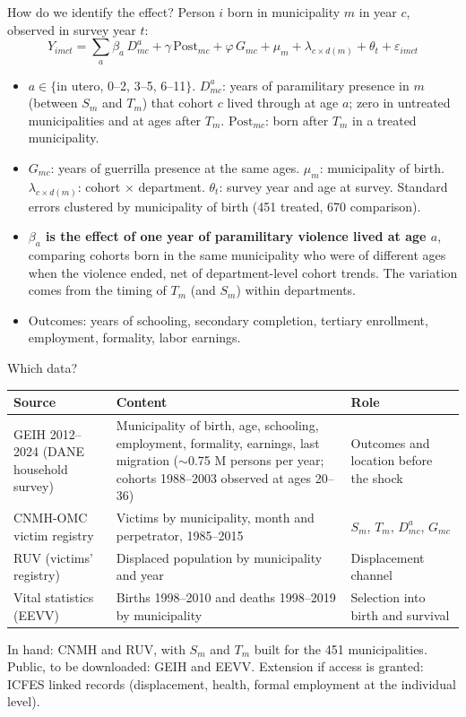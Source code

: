 \documentclass[aspectratio=169,10pt]{beamer}
\begin{document}
\begin{frame}{How do we identify the effect?}
Person $i$ born in municipality $m$ in year $c$, observed in survey year $t$:
\begin{equation*}
Y_{imct} = \sum_{a} \beta_a\, D^{a}_{mc} + \gamma\, \text{Post}_{mc} + \varphi\, G_{mc} + \mu_m + \lambda_{c \times d(m)} + \theta_{t} + \varepsilon_{imct}
\end{equation*}
\small
\begin{itemize}
\item $a \in \{$in utero, 0--2, 3--5, 6--11$\}$. $D^{a}_{mc}$: years of paramilitary presence in $m$ (between $S_m$ and $T_m$) that cohort $c$ lived through at age $a$; zero in untreated municipalities and at ages after $T_m$. $\text{Post}_{mc}$: born after $T_m$ in a treated municipality.
\item $G_{mc}$: years of guerrilla presence at the same ages. $\mu_m$: municipality of birth. $\lambda_{c\times d(m)}$: cohort $\times$ department. $\theta_t$: survey year and age at survey. Standard errors clustered by municipality of birth (451 treated, 670 comparison).
\item \textbf{$\beta_a$ is the effect of one year of paramilitary violence lived at age $a$}, comparing cohorts born in the same municipality who were of different ages when the violence ended, net of department-level cohort trends. The variation comes from the timing of $T_m$ (and $S_m$) within departments.
\item Outcomes: years of schooling, secondary completion, tertiary enrollment, employment, formality, labor earnings.
\end{itemize}
\end{frame}

\begin{frame}{Which data?}
\small
\renewcommand{\arraystretch}{1.25}
\begin{tabular}{@{}p{3.6cm}p{6.2cm}p{3.6cm}@{}}
\toprule
\textbf{Source} & \textbf{Content} & \textbf{Role} \\
\midrule
GEIH 2012--2024 (DANE household survey) & Municipality of birth, age, schooling, employment, formality, earnings, last migration ($\sim$0.75 M persons per year; cohorts 1988--2003 observed at ages 20--36) & Outcomes and location before the shock \\
CNMH-OMC victim registry & Victims by municipality, month and perpetrator, 1985--2015 & $S_m$, $T_m$, $D^{a}_{mc}$, $G_{mc}$ \\
RUV (victims' registry) & Displaced population by municipality and year & Displacement channel \\
Vital statistics (EEVV) & Births 1998--2010 and deaths 1998--2019 by municipality & Selection into birth and survival \\
\bottomrule
\end{tabular}
\vspace{0.6em}
In hand: CNMH and RUV, with $S_m$ and $T_m$ built for the 451 municipalities. Public, to be downloaded: GEIH and EEVV. Extension if access is granted: ICFES linked records (displacement, health, formal employment at the individual level).
\end{frame}
\end{document}
